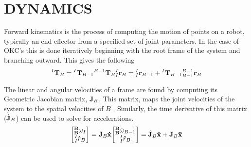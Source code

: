 \chapter{DYNAMICS} \label{chap:Kinematics}
Forward kinematics is the process of computing the motion of points on a robot, typically an end-effector \Cite{paul_1992} from a specified set of joint parameters. In the case of OKC's this is done iteratively beginning with the root frame of the system and branching outward. This gives the following
\begin{align}
	\begin{split}                                                           
	{^I\mathbf{T}_B} = {^I\mathbf{T}_{B-1}}{^{B - 1}\mathbf{T}_{B}}                                 
	\end{split}                                                             
	\begin{split}                                                           
	{^I_I\mathbf{r}_B} =  {^I_I\mathbf{r}_{B - 1}} + {^{I}\mathbf{T}_{B-1}}{^{B - 1}_{B - 1}\mathbf{r}_{B}} 
	\end{split}                                                             
\end{align}

\noindent The linear and angular velocities of a frame are found by computing its Geometric Jacobian matrix, $\mathbf{J}_B$. This matrix, maps the joint velocities of the system to the spatial velocities of $B$ \Cite{shabana_2010}. Similarly, the time derivative of this matrix ($\dot{\mathbf{J}}_B$) can be used to solve for accelerations.
\begin{align*}
	\begin{split}                               
	\begin{bmatrix}                             
	{^\mathbf{B}_\mathbf{B}\omega_{I}}                             \\
	{^I_I\dot{r}_B}                             
	\end{bmatrix} = \mathbf{J}_B {\mathbf{\dot{x}}}                  
	\end{split}                                 
	\begin{split}                               
	\begin{bmatrix}                             
	{^\mathbf{B}_\mathbf{B}\dot{\omega}_{B - 1}}                  \\
	{^I_I\ddot{r}_B}                            
	\end{bmatrix} = \dot{\mathbf{J}}_B {\mathbf{\dot{x}}} + \mathbf{J}_B {\mathbf{\Ddot{x}}} 
	\end{split}                                 
\end{align*}

